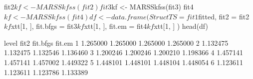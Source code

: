 \begin{Schunk}
\begin{Sinput}
 fit2$kf <- MARSSkfss(fit2)
 fit3$kf <- MARSSkfss(fit3)
 fit4$kf <- MARSSkfss(fit4)
 df <- data.frame(
   StructTS = fit1$fitted, fit2 = fit2$kf$xtt[1, ],
   fit.bfgs = fit3$kf$xtt[1, ], fit.em = fit4$kf$xtt[1, ]
 )
 head(df)
\end{Sinput}
\begin{Soutput}
     level     fit2 fit.bfgs   fit.em
1 1.265000 1.265000 1.265000 1.265000
2 1.132475 1.132475 1.132546 1.136460
3 1.200246 1.200246 1.200210 1.198366
4 1.457141 1.457141 1.457002 1.449322
5 1.448101 1.448101 1.448104 1.448054
6 1.123611 1.123611 1.123786 1.133389
\end{Soutput}
\end{Schunk}
